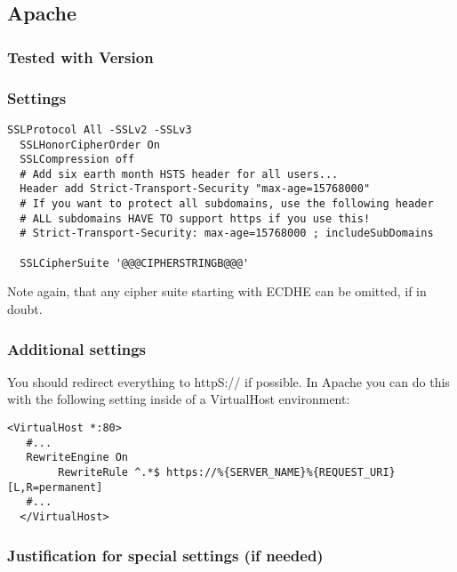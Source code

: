
\subsection{Apache}

\subsubsection{Tested with Version}

\subsubsection{Settings} 

\begin{lstlisting}[breaklines]
  SSLProtocol All -SSLv2 -SSLv3 
  SSLHonorCipherOrder On
  SSLCompression off
  # Add six earth month HSTS header for all users...
  Header add Strict-Transport-Security "max-age=15768000"
  # If you want to protect all subdomains, use the following header
  # ALL subdomains HAVE TO support https if you use this!
  # Strict-Transport-Security: max-age=15768000 ; includeSubDomains

  SSLCipherSuite '@@@CIPHERSTRINGB@@@'

\end{lstlisting}

Note again, that any cipher suite starting with ECDHE can be omitted, if in doubt.


\subsubsection{Additional settings}

You should redirect everything to httpS:// if possible. In Apache you can do this with the following setting inside of a VirtualHost environment:

\begin{lstlisting}[breaklines]
  <VirtualHost *:80>
   #...
   RewriteEngine On
        RewriteRule ^.*$ https://%{SERVER_NAME}%{REQUEST_URI} [L,R=permanent]
   #...
  </VirtualHost>
\end{lstlisting}

\subsubsection{Justification for special settings (if needed)}

